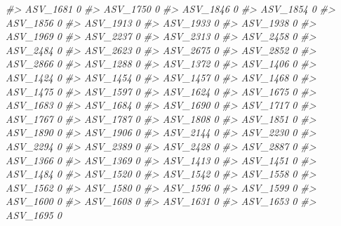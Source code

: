 \documentclass[
]{article}
\newenvironment{Shaded}{\begin{snugshade}}{\end{snugshade}}
\newcommand{\CommentTok}[1]{\textcolor[rgb]{0.56,0.35,0.01}{\textit{#1}}}
\begin{document}
\begin{Shaded}
\begin{Highlighting}[]
\CommentTok{\#\textgreater{} ASV\_1681  0}
\CommentTok{\#\textgreater{} ASV\_1750  0}
\CommentTok{\#\textgreater{} ASV\_1846  0}
\CommentTok{\#\textgreater{} ASV\_1854  0}
\CommentTok{\#\textgreater{} ASV\_1856  0}
\CommentTok{\#\textgreater{} ASV\_1913  0}
\CommentTok{\#\textgreater{} ASV\_1933  0}
\CommentTok{\#\textgreater{} ASV\_1938  0}
\CommentTok{\#\textgreater{} ASV\_1969  0}
\CommentTok{\#\textgreater{} ASV\_2237  0}
\CommentTok{\#\textgreater{} ASV\_2313  0}
\CommentTok{\#\textgreater{} ASV\_2458  0}
\CommentTok{\#\textgreater{} ASV\_2484  0}
\CommentTok{\#\textgreater{} ASV\_2623  0}
\CommentTok{\#\textgreater{} ASV\_2675  0}
\CommentTok{\#\textgreater{} ASV\_2852  0}
\CommentTok{\#\textgreater{} ASV\_2866  0}
\CommentTok{\#\textgreater{} ASV\_1288  0}
\CommentTok{\#\textgreater{} ASV\_1372  0}
\CommentTok{\#\textgreater{} ASV\_1406  0}
\CommentTok{\#\textgreater{} ASV\_1424  0}
\CommentTok{\#\textgreater{} ASV\_1454  0}
\CommentTok{\#\textgreater{} ASV\_1457  0}
\CommentTok{\#\textgreater{} ASV\_1468  0}
\CommentTok{\#\textgreater{} ASV\_1475  0}
\CommentTok{\#\textgreater{} ASV\_1597  0}
\CommentTok{\#\textgreater{} ASV\_1624  0}
\CommentTok{\#\textgreater{} ASV\_1675  0}
\CommentTok{\#\textgreater{} ASV\_1683  0}
\CommentTok{\#\textgreater{} ASV\_1684  0}
\CommentTok{\#\textgreater{} ASV\_1690  0}
\CommentTok{\#\textgreater{} ASV\_1717  0}
\CommentTok{\#\textgreater{} ASV\_1767  0}
\CommentTok{\#\textgreater{} ASV\_1787  0}
\CommentTok{\#\textgreater{} ASV\_1808  0}
\CommentTok{\#\textgreater{} ASV\_1851  0}
\CommentTok{\#\textgreater{} ASV\_1890  0}
\CommentTok{\#\textgreater{} ASV\_1906  0}
\CommentTok{\#\textgreater{} ASV\_2144  0}
\CommentTok{\#\textgreater{} ASV\_2230  0}
\CommentTok{\#\textgreater{} ASV\_2294  0}
\CommentTok{\#\textgreater{} ASV\_2389  0}
\CommentTok{\#\textgreater{} ASV\_2428  0}
\CommentTok{\#\textgreater{} ASV\_2887  0}
\CommentTok{\#\textgreater{} ASV\_1366  0}
\CommentTok{\#\textgreater{} ASV\_1369  0}
\CommentTok{\#\textgreater{} ASV\_1413  0}
\CommentTok{\#\textgreater{} ASV\_1451  0}
\CommentTok{\#\textgreater{} ASV\_1484  0}
\CommentTok{\#\textgreater{} ASV\_1520  0}
\CommentTok{\#\textgreater{} ASV\_1542  0}
\CommentTok{\#\textgreater{} ASV\_1558  0}
\CommentTok{\#\textgreater{} ASV\_1562  0}
\CommentTok{\#\textgreater{} ASV\_1580  0}
\CommentTok{\#\textgreater{} ASV\_1596  0}
\CommentTok{\#\textgreater{} ASV\_1599  0}
\CommentTok{\#\textgreater{} ASV\_1600  0}
\CommentTok{\#\textgreater{} ASV\_1608  0}
\CommentTok{\#\textgreater{} ASV\_1631  0}
\CommentTok{\#\textgreater{} ASV\_1653  0}
\CommentTok{\#\textgreater{} ASV\_1695  0}

\end{Highlighting}
\end{Shaded}
\end{document}
